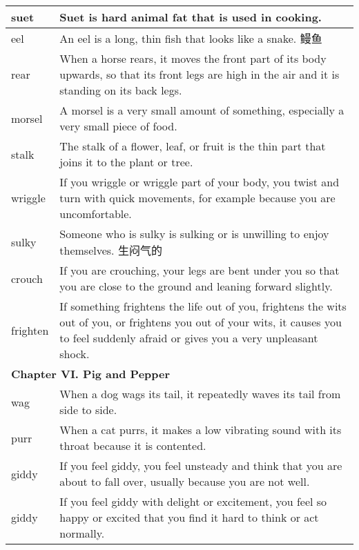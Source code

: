 \documentclass{ctexart}
\begin{document}
\begin{center}
\begin{longtable}{|l|p{7.8cm}|}
\hline
suet
&
Suet is hard animal fat that is used in cooking.
\\


\hline
eel
&
An eel is a long, thin fish that looks like a snake. 鳗鱼
\\

\hline
rear
&
When a horse rears, it moves the front part of its body upwards, so that its front legs are high in the air and it is standing on its back legs.
\\

\hline
morsel
&
A morsel is a very small amount of something, especially a very small piece of food.
\\

\hline
stalk
&
The stalk of a flower, leaf, or fruit is the thin part that joins it to the plant or tree.
\\

\hline
wriggle
&
If you wriggle or wriggle part of your body, you twist and turn with quick movements, for example because you are uncomfortable.
\\

\hline
sulky
&
Someone who is sulky is sulking or is unwilling to enjoy themselves. 生闷气的
\\

\hline
crouch
&
If you are crouching, your legs are bent under you so that you are close to the ground and leaning forward slightly.
\\

\hline
frighten
&
If something frightens the life out of you, frightens the wits out of you, or frightens you out of your wits, it causes you to feel suddenly afraid or gives you a very unpleasant shock.
\\

\hline
\multicolumn{2}{|l|}{\textbf{Chapter VI. Pig and Pepper}}\\

\hline
wag
&
When a dog wags its tail, it repeatedly waves its tail from side to side.
\\

\hline
purr
&
When a cat purrs, it makes a low vibrating sound with its throat because it is contented.
\\

\hline
giddy
&
If you feel giddy, you feel unsteady and think that you are about to fall over, usually because you are not well.
\\

\hline
giddy
&
If you feel giddy with delight or excitement, you feel so happy or excited that you find it hard to think or act normally.
\\


\end{longtable}
\end{center}
\end{document}
